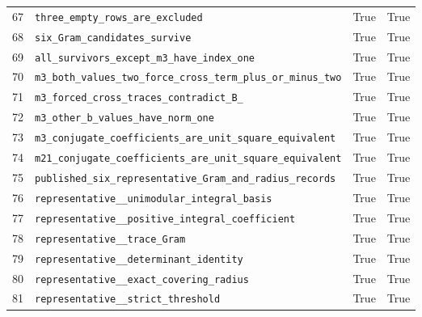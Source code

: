 \documentclass[12pt]{amsart}
\theoremstyle{remark}
\theoremstyle{definition}
\numberwithin{equation}{section}
\begin{document}
\begin{longtable}{rL{11cm}cc}
67 & \texttt{three\_\allowbreak empty\_\allowbreak rows\_\allowbreak are\_\allowbreak excluded} & True & True \\
68 & \texttt{six\_\allowbreak Gram\_\allowbreak candidates\_\allowbreak survive} & True & True \\
69 & \texttt{all\_\allowbreak survivors\_\allowbreak except\_\allowbreak m3\_\allowbreak have\_\allowbreak index\_\allowbreak one} & True & True \\
70 & \texttt{m3\_\allowbreak both\_\allowbreak values\_\allowbreak two\_\allowbreak force\_\allowbreak cross\_\allowbreak term\_\allowbreak plus\_\allowbreak or\_\allowbreak minus\_\allowbreak two} & True & True \\
71 & \texttt{m3\_\allowbreak forced\_\allowbreak cross\_\allowbreak traces\_\allowbreak contradict\_\allowbreak B\_} & True & True \\
72 & \texttt{m3\_\allowbreak other\_\allowbreak b\_\allowbreak values\_\allowbreak have\_\allowbreak norm\_\allowbreak one} & True & True \\
73 & \texttt{m3\_\allowbreak conjugate\_\allowbreak coefficients\_\allowbreak are\_\allowbreak unit\_\allowbreak square\_\allowbreak equivalent} & True & True \\
74 & \texttt{m21\_\allowbreak conjugate\_\allowbreak coefficients\_\allowbreak are\_\allowbreak unit\_\allowbreak square\_\allowbreak equivalent} & True & True \\
75 & \texttt{published\_\allowbreak six\_\allowbreak representative\_\allowbreak Gram\_\allowbreak and\_\allowbreak radius\_\allowbreak records} & True & True \\
76 & \texttt{representative\_\_\allowbreak unimodular\_\allowbreak integral\_\allowbreak basis} & True & True \\
77 & \texttt{representative\_\_\allowbreak positive\_\allowbreak integral\_\allowbreak coefficient} & True & True \\
78 & \texttt{representative\_\_\allowbreak trace\_\allowbreak Gram} & True & True \\
79 & \texttt{representative\_\_\allowbreak determinant\_\allowbreak identity} & True & True \\
80 & \texttt{representative\_\_\allowbreak exact\_\allowbreak covering\_\allowbreak radius} & True & True \\
81 & \texttt{representative\_\_\allowbreak strict\_\allowbreak threshold} & True & True \\

\end{longtable}
\end{document}

